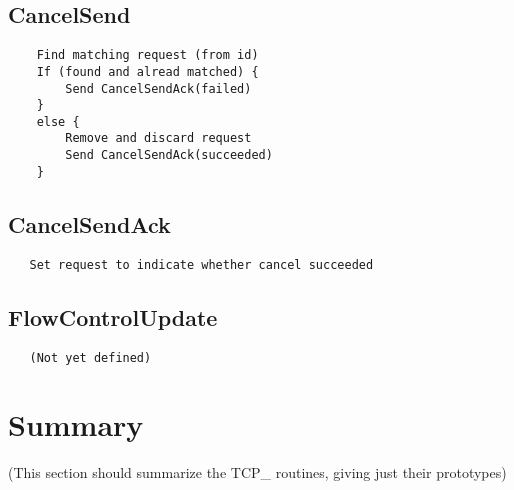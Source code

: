 \documentclass{article}
\begin{document}
\subsection{CancelSend}
\begin{verbatim}
    Find matching request (from id)
    If (found and alread matched) {
        Send CancelSendAck(failed)
    }
    else {
        Remove and discard request
        Send CancelSendAck(succeeded)
    }
 \end{verbatim}

\subsection{CancelSendAck}
\begin{verbatim}
   Set request to indicate whether cancel succeeded
\end{verbatim}

\subsection{FlowControlUpdate}
\begin{verbatim}
   (Not yet defined)
\end{verbatim}

\section{Summary}
\label{sec:tcpadi-summary}
(This section should summarize the TCP\_ routines, giving just their prototypes)
\end{document}
